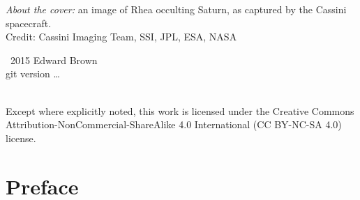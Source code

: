 
\maketitle
\newpage
\begin{fullwidth}
\thispagestyle{empty}

\vspace{3\baselineskip}
\noindent \emph{About the cover:} an image of Rhea occulting Saturn, as captured by the Cassini spacecraft.\\
\noindent Credit: Cassini Imaging Team, SSI, JPL, ESA, NASA

\vfill
\noindent \ccCopy\ 2015 Edward Brown\\
\noindent git version \ldots

\vspace{3\baselineskip}
\noindent \ccbyncsa \\
\noindent Except where explicitly noted, this work is licensed under the Creative Commons
Attribution-NonCommercial-ShareAlike 4.0 International (CC BY-NC-SA
4.0) license.

\end{fullwidth}
\newpage
\chapter*{Preface}


\tableofcontents
\listoffigures
\listofexercises
